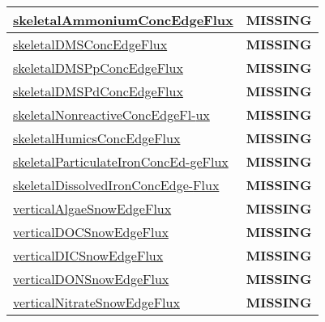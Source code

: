 {\begin{center}
\begin{longtable}{| p{2.0in} | p{4.0in} |}
    \hline
    \hyperref[subsec:var_sec_tracer_edge_fluxes_skeletalAmmoniumConcEdgeFlux]{skeletalAmmoniumConcEdgeFlux} & {\bf \color{red} MISSING} \\
    \hline
    \hyperref[subsec:var_sec_tracer_edge_fluxes_skeletalDMSConcEdgeFlux]{skeletalDMSConcEdgeFlux} & {\bf \color{red} MISSING} \\
    \hline
    \hyperref[subsec:var_sec_tracer_edge_fluxes_skeletalDMSPpConcEdgeFlux]{skeletalDMSPpConcEdgeFlux} & {\bf \color{red} MISSING} \\
    \hline
    \hyperref[subsec:var_sec_tracer_edge_fluxes_skeletalDMSPdConcEdgeFlux]{skeletalDMSPdConcEdgeFlux} & {\bf \color{red} MISSING} \\
    \hline
    \hyperref[subsec:var_sec_tracer_edge_fluxes_skeletalNonreactiveConcEdgeFlux]{skeletalNonreactiveConcEdgeFl-}\hyperref[subsec:var_sec_tracer_edge_fluxes_skeletalNonreactiveConcEdgeFlux]{ux  }& {\bf \color{red} MISSING} \\
    \hline
    \hyperref[subsec:var_sec_tracer_edge_fluxes_skeletalHumicsConcEdgeFlux]{skeletalHumicsConcEdgeFlux} & {\bf \color{red} MISSING} \\
    \hline
    \hyperref[subsec:var_sec_tracer_edge_fluxes_skeletalParticulateIronConcEdgeFlux]{skeletalParticulateIronConcEd-}\hyperref[subsec:var_sec_tracer_edge_fluxes_skeletalParticulateIronConcEdgeFlux]{geFlux  }& {\bf \color{red} MISSING} \\
    \hline
    \hyperref[subsec:var_sec_tracer_edge_fluxes_skeletalDissolvedIronConcEdgeFlux]{skeletalDissolvedIronConcEdge-}\hyperref[subsec:var_sec_tracer_edge_fluxes_skeletalDissolvedIronConcEdgeFlux]{Flux  }& {\bf \color{red} MISSING} \\
    \hline
    \hyperref[subsec:var_sec_tracer_edge_fluxes_verticalAlgaeSnowEdgeFlux]{verticalAlgaeSnowEdgeFlux} & {\bf \color{red} MISSING} \\
    \hline
    \hyperref[subsec:var_sec_tracer_edge_fluxes_verticalDOCSnowEdgeFlux]{verticalDOCSnowEdgeFlux} & {\bf \color{red} MISSING} \\
    \hline
    \hyperref[subsec:var_sec_tracer_edge_fluxes_verticalDICSnowEdgeFlux]{verticalDICSnowEdgeFlux} & {\bf \color{red} MISSING} \\
    \hline
    \hyperref[subsec:var_sec_tracer_edge_fluxes_verticalDONSnowEdgeFlux]{verticalDONSnowEdgeFlux} & {\bf \color{red} MISSING} \\
    \hline
    \hyperref[subsec:var_sec_tracer_edge_fluxes_verticalNitrateSnowEdgeFlux]{verticalNitrateSnowEdgeFlux} & {\bf \color{red} MISSING} \\

\end{longtable}
\end{center}}
